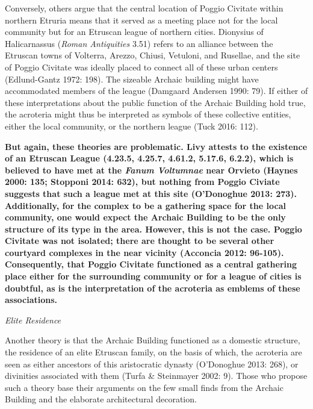 Conversely, others argue that the central location of Poggio Civitate
within northern Etruria means that it served as a meeting place not for
the local community but for an Etruscan league of northern cities.
Dionysius of Halicarnassus (\emph{Roman Antiquities} 3.51) refers to an
alliance between the Etruscan towns of Volterra, Arezzo, Chiusi,
Vetuloni, and Rusellae, and the site of Poggio Civitate was ideally
placed to connect all of these urban centers (Edlund-Gantz 1972: 198).
The sizeable Archaic building might have accommodated members of the
league (Damgaard Andersen 1990: 79). If either of these interpretations
about the public function of the Archaic Building hold true, the
acroteria might thus be interpreted as symbols of these collective
entities, either the local community, or the northern league (Tuck 2016:
112).

\textbf{But again, these theories are problematic. Livy attests to the
existence of an Etruscan League (4.23.5, 4.25.7, 4.61.2, 5.17.6, 6.2.2),
which is believed to have met at the \emph{Fanum Voltumnae} near Orvieto
(Haynes 2000: 135; Stopponi 2014: 632), but nothing from Poggio Civiate
suggests that such a league met at this site (O'Donoghue 2013: 273).}
\textbf{Additionally, for the complex to be a gathering space for the
local community, one would expect the Archaic Building to be the only
structure of its type in the area. However, this is not the case. Poggio
Civitate was not isolated; there are thought to be several other
courtyard complexes in the near vicinity (Acconcia 2012: 96-105).
Consequently, that Poggio Civitate functioned as a central gathering
place either for the surrounding community or for a league of cities is
doubtful, as is the interpretation of the acroteria as emblems of these
associations.}

\emph{Elite Residence}

Another theory is that the Archaic Building functioned as a domestic
structure, the residence of an elite Etruscan family, on the basis of
which, the acroteria are seen as either ancestors of this aristocratic
dynasty (O'Donoghue 2013: 268), or divinities associated with them
(Turfa \& Steinmayer 2002: 9). Those who propose such a theory base
their arguments on the few small finds from the Archaic Building and the
elaborate architectural decoration.

